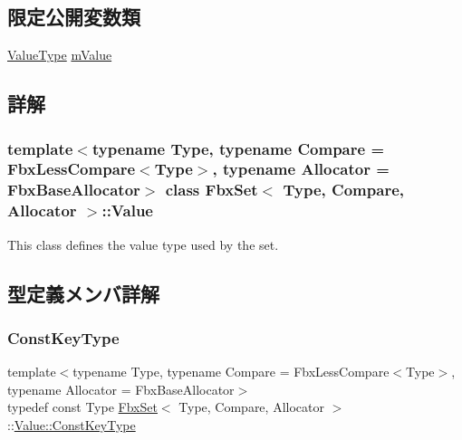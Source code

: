 \subsection*{限定公開変数類}
\begin{DoxyCompactItemize}
\item 
\hyperlink{class_fbx_set_1_1_value_aa4757d6676c438c18ab271c57997d8eb}{Value\+Type} \hyperlink{class_fbx_set_1_1_value_ae8a99bc167579b0edf8e131f4a7731a9}{m\+Value}
\end{DoxyCompactItemize}


\subsection{詳解}
\subsubsection*{template$<$typename Type, typename Compare = Fbx\+Less\+Compare$<$\+Type$>$, typename Allocator = Fbx\+Base\+Allocator$>$\newline
class Fbx\+Set$<$ Type, Compare, Allocator $>$\+::\+Value}

This class defines the value type used by the set. 

\subsection{型定義メンバ詳解}
\mbox{\label{class_fbx_set_1_1_value_a184e74f6d42151d97b2c1381b5f642e7}} 
\subsubsection{\texorpdfstring{Const\+Key\+Type}{ConstKeyType}}
{\footnotesize\ttfamily template$<$typename Type, typename Compare = Fbx\+Less\+Compare$<$\+Type$>$, typename Allocator = Fbx\+Base\+Allocator$>$ \\
typedef const Type \hyperlink{class_fbx_set}{Fbx\+Set}$<$ Type, Compare, Allocator $>$\+::\hyperlink{class_fbx_set_1_1_value_a184e74f6d42151d97b2c1381b5f642e7}{Value\+::\+Const\+Key\+Type}}

\mbox{\label{class_fbx_set_1_1_value_a4b01735d9b84587bb21bd4a9d75e419b}} 
